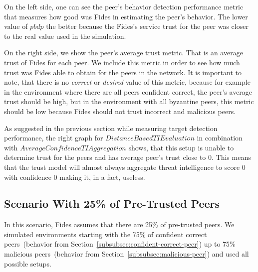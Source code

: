 On the left side, one can see the peer's behavior detection performance metric that measures how good was Fides in estimating the peer's behavior. The lower value of $pbdp$ the better because the Fides's service trust for the peer was closer to the real value used in the simulation.

On the right side, we show the peer's average trust metric. That is an average trust of Fides for each peer. We include this metric in order to see how much trust was Fides able to obtain for the peers in the network.
It is important to note, that there is no \textit{correct} or \textit{desired} value of this metric, because for example in the environment where there are all peers confident correct, the peer's average trust should be high, but in the environment with all byzantine peers, this metric should be low because Fides should not trust incorrect and malicious peers.

As suggested in the previous section while measuring target detection performance, the right graph for $DistanceBasedTIEvaluation$ in combination with $AverageConfidenceTIAggregation$ shows, that this setup is unable to determine trust for the peers and has average peer's trust close to $0$. This means that the trust model will almost always aggregate threat intelligence to score $0$ with confidence $0$ making it, in a fact, useless. 

\cleartoleftpage
\subsection{Scenario With 25\% of Pre-Trusted Peers}
\label{subsec:scenario-with-25-pretrusted-peers}

In this scenario, Fides assumes that there are 25\% of pre-trusted peers. We simulated environments starting with the 75\% of confident correct peers~(behavior from Section~\ref{subsubsec:confident-correct-peer}) up to 75\% malicious peers~(behavior from Section~\ref{subsubsec:malicious-peer}) and used all possible setups.

